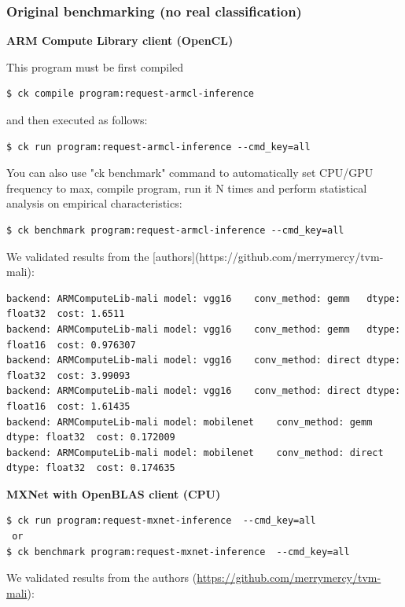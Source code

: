 \documentclass[sigplan]{acmart}
\begin{document}
\subsubsection{Original benchmarking (no real classification)}

\textbf{ARM Compute Library client (OpenCL)}

This program must be first compiled

\begin{verbatim}
$ ck compile program:request-armcl-inference 
\end{verbatim}

and then executed as follows:

\begin{verbatim}
$ ck run program:request-armcl-inference --cmd_key=all
\end{verbatim}

You can also use "ck benchmark" command to automatically set CPU/GPU frequency to max, 
compile program, run it N times and perform statistical analysis on empirical characteristics:

\begin{verbatim}
$ ck benchmark program:request-armcl-inference --cmd_key=all
\end{verbatim}

We validated results from the [authors](https://github.com/merrymercy/tvm-mali):

\begin{verbatim}
backend: ARMComputeLib-mali	model: vgg16	conv_method: gemm	dtype: float32	cost: 1.6511
backend: ARMComputeLib-mali	model: vgg16	conv_method: gemm	dtype: float16	cost: 0.976307
backend: ARMComputeLib-mali	model: vgg16	conv_method: direct	dtype: float32	cost: 3.99093
backend: ARMComputeLib-mali	model: vgg16	conv_method: direct	dtype: float16	cost: 1.61435
backend: ARMComputeLib-mali	model: mobilenet	conv_method: gemm	dtype: float32	cost: 0.172009
backend: ARMComputeLib-mali	model: mobilenet	conv_method: direct	dtype: float32	cost: 0.174635
\end{verbatim}

\textbf{MXNet with OpenBLAS client (CPU)}

\begin{verbatim} 
$ ck run program:request-mxnet-inference  --cmd_key=all
 or
$ ck benchmark program:request-mxnet-inference  --cmd_key=all

\end{verbatim}

We validated results from the authors (\url{https://github.com/merrymercy/tvm-mali}):
\end{document}
